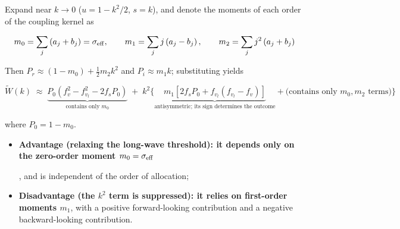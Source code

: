 \documentclass[11pt,a4paper,openany]{book}
\numberwithin{equation}{chapter}
\numberwithin{figure}{chapter}
\numberwithin{table}{chapter}
\begin{document}
Expand near $k\to0$ ($u=1-k^2/2$, $s=k$), and denote the moments of each order of the coupling kernel as

\begin{equation}
m_0 = \sum_j\left(a_j+b_j\right) = \sigma_{\rm eff},
\qquad
m_1 = \sum_j j\left(a_j-b_j\right),
\qquad
m_2 = \sum_j j^2\left(a_j+b_j\right)
\end{equation}

Then $P_r \approx \left(1-m_0\right) + \tfrac12 m_2k^2$ and $P_i\approx m_1k$; substituting yields

\begin{equation}
\widetilde W(k) \;\approx\; \underbrace{P_0\left(f_v^2-f_{v_l}^2-2f_sP_0\right)}_{\text{contains only  }m_0}
\;+\; k^2\Big\{\underbrace{m_1\left[2f_sP_0+f_{v_l}\left(f_{v_l}-f_v\right)\right]}_{\text{antisymmetric; its sign determines the outcome}} + \big(\text{contains only  }m_0,m_2\text{ terms}\big)\Big\}
\end{equation}

where $P_0=1-m_0$.










\begin{tcolorbox}[keybox,title=\textbf{Conclusion}]
\begin{itemize}[leftmargin=1.2em,itemsep=3pt]
\item \textbf{Advantage (relaxing the long-wave threshold): it depends only on the zero-order moment $m_0=\sigma_{\rm eff}$
}




, and is independent of the order of allocation;







\item \textbf{Disadvantage (the $k^2$ term is suppressed): it relies on first-order moments $m_1$}, with a positive forward-looking contribution and a negative backward-looking contribution.







\end{itemize}
\end{tcolorbox}
\end{document}
